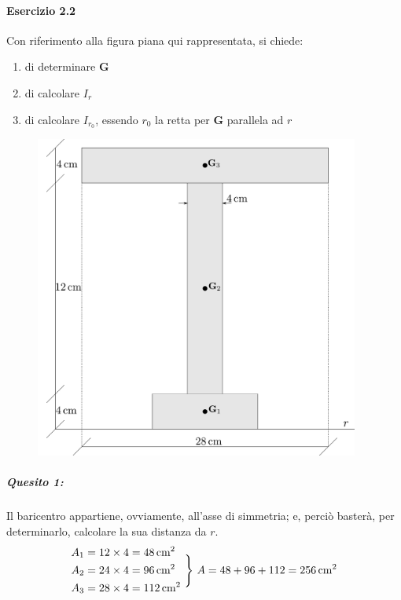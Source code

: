 \paragraph{Esercizio 2.2}
Con riferimento alla figura piana qui rappresentata, si chiede:
\begin{enumerate}
\item di determinare $\mathbf{G}$
\item di calcolare $I_r$
\item di calcolare $I_{r_0}$, essendo $r_0$ la retta per $\mathbf{G}$ parallela ad $r$
\end{enumerate}
\renewcommand{\thefigure}{2.2~-~1}
\begin{figure}[ht]
\centering
\includegraphics[width=0.95\textwidth]{Immagini/Parte_2/Esercizio2_2/Esercizio2_2_1.pdf}
\caption{}
\label{Esercizio2_1}
\end{figure}
\noindent
\subparagraph{Quesito 1:} Il baricentro appartiene, ovviamente, all'asse di simmetria; e, perciò basterà, per determinarlo, calcolare la sua distanza da $r$.
\begin{equation*}
\begin{aligned}
A_1 &= 12\times 4 = 48\,\textup{cm}^2 \\
A_2 &= 24\times 4 = 96\,\textup{cm}^2 \\
A_3 &= 28\times 4 = 112\,\textup{cm}^2
\end{aligned}
\,\,\Biggr\}\,\, A = 48+96+112 = 256\,\textup{cm}^2
\end{equation*}
